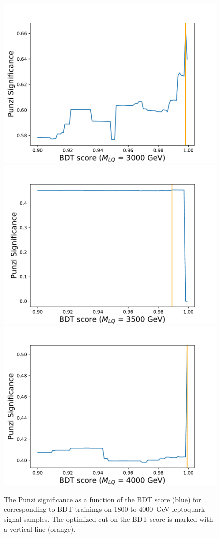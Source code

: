 \begin{figure}[H]
    {\includegraphics[width=.32\textwidth]{Images/Analysis/Results_combined_Unblinded/Plots/Optimization/Opt_BDT_M3000.pdf}}
    {\includegraphics[width=.32\textwidth]{Images/Analysis/Results_combined_Unblinded/Plots/Optimization/Opt_BDT_M3500.pdf}}
    {\includegraphics[width=.32\textwidth]{Images/Analysis/Results_combined_Unblinded/Plots/Optimization/Opt_BDT_M4000.pdf}}
    \caption{The Punzi significance as a function of the BDT score (blue) for corresponding to BDT trainings on 1800 to \SI{4000}{GeV} leptoquark signal samples. The optimized cut on the BDT score is marked with a vertical line (orange).
    \label{figapp:punzivsbdt2}}
\end{figure}



